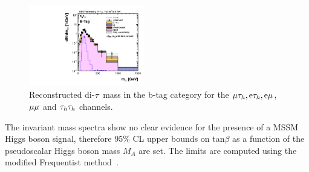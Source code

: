 \begin{figure}[!h]
\begin{center}
 \includegraphics[width=0.45\textwidth]{MSSM/PLOTS/tauTau_btag_postfit_8TeV_LOG.pdf}
 \caption{Reconstructed di-$\mathrm{\tau}$ mass in the b-tag category for the $\mathrm{\mu}\mathrm{\tau}_{h}, \mathrm{e}\mathrm{\tau}_{h}, \mathrm{e}\mathrm{\mu}$, $\mathrm{\mu}\mathrm{\mu}$ and $\mathrm{\tau}_{h}\mathrm{\tau}_{h}$  channels.}
  \label{fig:mass_b_tag}\end{center}\end{figure}


The invariant mass spectra show no clear evidence for the presence of a MSSM Higgs boson signal, 
therefore 95\% CL upper bounds on tan$\beta$ as a function of the pseudoscalar Higgs boson mass $M_A$ are set.
The limits are computed using the modified Frequentist method~\cite{Read}.






